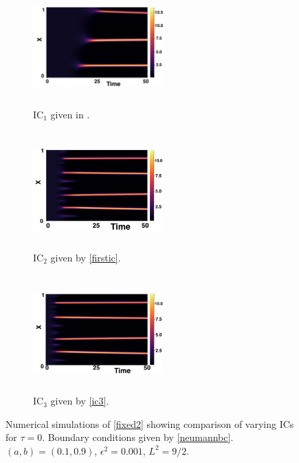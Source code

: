 \begin{figure}[H]
    \centering
    \begin{subfigure}[b]{0.32\textwidth}
        \centering
        \includegraphics[width=5cm,height=4.5cm]{gaff0.png}
        \caption{$\text{IC}_1$ given in \cite{gaffmonk}.}
        \label{}
    \end{subfigure}
    \hfill
    \begin{subfigure}[b]{0.32\textwidth}
        \centering
        \includegraphics[width=5cm,height=4.5cm]{ic20.png}
        \caption{$\text{IC}_2$ given by \eqref{firstic}.}
        \label{}
    \end{subfigure}
    \hfill
    \begin{subfigure}[b]{0.32\textwidth}
        \centering
        \includegraphics[width=5cm,height=4.5cm]{ic30.png}
        \caption{$\text{IC}_3$ given by \eqref{ic3}.}
        \label{}
    \end{subfigure}
    \caption{Numerical simulations of \eqref{fixed2} showing comparison of varying ICs for $\tau=0$. Boundary conditions given by \eqref{neumannbc}. $(a,b)=(0.1,0.9)$, $\epsilon^2=0.001$, $L^2=9/2$. }
    \label{fig:figtau0}
\end{figure}
